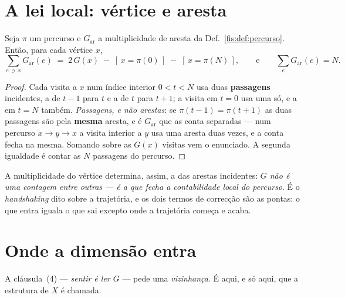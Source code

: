 \documentclass[livro.tex]{subfiles}
\begin{document}

\section{A lei local: vértice e aresta}\label{fis:handshake}

\begin{teorema}\label{fis:thm:handshake}
Seja $\pi$ um percurso e $G_{\mathrm{ar}}$ a multiplicidade de aresta da
Def.~\ref{fis:def:percurso}. Então, para cada vértice $x$,
\[
\sum_{e\,\ni\,x}G_{\mathrm{ar}}(e)\;=\;2\,G(x)\;-\;[\,x=\pi(0)\,]\;-\;[\,x=\pi(N)\,],
\qquad\text{e}\qquad \sum_{e}G_{\mathrm{ar}}(e)=N .
\]
\end{teorema}

\begin{proof}

Cada visita a $x$ num índice interior $0<t<N$ usa duas \textbf{passagens}
incidentes, a de $t-1$ para $t$ e a de $t$ para $t+1$; a visita em $t=0$ usa uma
só, e a em $t=N$ também. \emph{Passagens, e não arestas}: se $\pi(t-1)=\pi(t+1)$
as duas passagens são pela \textbf{mesma} aresta, e é $G_{\mathrm{ar}}$ que as
conta separadas --- num percurso $x\to y\to x$ a visita interior a $y$ usa uma
aresta duas vezes, e a conta fecha na mesma. Somando sobre as $G(x)$ visitas vem
o enunciado. A segunda igualdade é contar as $N$ passagens do percurso.
\end{proof}

\medskip\noindent A multiplicidade do vértice determina, assim, a das arestas
incidentes: \emph{$G$ não é uma contagem entre outras --- é a que fecha a
contabilidade local do percurso}. É o \emph{handshaking} dito sobre a trajetória,
e os dois termos de correcção são as pontas: o que entra iguala o que sai excepto
onde a trajetória começa e acaba.



\section{Onde a dimensão entra}\label{fis:grau}

\noindent A cláusula~(4) --- \emph{sentir é ler $G$} --- pede uma
\emph{vizinhança}. É aqui, e só aqui, que a estrutura de $X$ é chamada.
\end{document}
